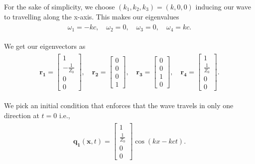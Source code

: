 For the sake of simplicity, we choose $\left(k_1,k_2,k_3\right) = \left(k,0,0\right)$ inducing our wave to travelling along the x-axis. This makes our eigenvalues
\begin{align}
    \begin{split}
        \omega_1 = -k c, \quad
        \omega_2 = 0, \quad
        \omega_3 = 0, \quad
        \omega_4 = k c .
    \end{split}
\end{align}

We get our eigenvectors as
\begin{align}
    \begin{split}
    \mathbf{r_1} = \begin{bmatrix}
        1 \\
-\frac{1}{Z_0} \\
0 \\
0
        \end{bmatrix}, \quad
        \mathbf{r_2} = \begin{bmatrix}
            0 \\
0 \\
0 \\
1
            \end{bmatrix}, \quad
            \mathbf{r_3} = \begin{bmatrix}
                0 \\
                0 \\
                1 \\
                0
                \end{bmatrix}, \quad
                \mathbf{r_4} = \begin{bmatrix}
                    1 \\
                    \frac{1}{Z_0} \\
                    0 \\
                    0                    
                \end{bmatrix} .
    \end{split}
\end{align}

We pick an initial condition that enforces that the wave travels in only one direction at $t=0$ i.e.,
\begin{align}
    \begin{split}
        \mathbf{q_1}\left(\mathbf{x}, t\right) = \begin{bmatrix}
            1 \\
            \frac{1}{Z_0} \\
            0 \\
            0
            \end{bmatrix} \cos\left(kx - k ct\right) .
    \end{split}
\end{align}

